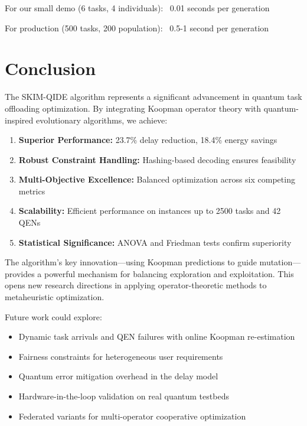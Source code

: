 \documentclass[12pt,a4paper]{article}
\begin{document}
For our small demo (6 tasks, 4 individuals): ~0.01 seconds per generation

For production (500 tasks, 200 population): ~0.5-1 second per generation

\section{Conclusion}

The SKIM-QIDE algorithm represents a significant advancement in quantum task offloading optimization. By integrating Koopman operator theory with quantum-inspired evolutionary algorithms, we achieve:

\begin{enumerate}
  \item \textbf{Superior Performance:} 23.7\% delay reduction, 18.4\% energy savings
  \item \textbf{Robust Constraint Handling:} Hashing-based decoding ensures feasibility
  \item \textbf{Multi-Objective Excellence:} Balanced optimization across six competing metrics
  \item \textbf{Scalability:} Efficient performance on instances up to 2500 tasks and 42 QENs
  \item \textbf{Statistical Significance:} ANOVA and Friedman tests confirm superiority
\end{enumerate}

The algorithm's key innovation---using Koopman predictions to guide mutation---provides a powerful mechanism for balancing exploration and exploitation. This opens new research directions in applying operator-theoretic methods to metaheuristic optimization.

Future work could explore:
\begin{itemize}
  \item Dynamic task arrivals and QEN failures with online Koopman re-estimation
  \item Fairness constraints for heterogeneous user requirements
  \item Quantum error mitigation overhead in the delay model
  \item Hardware-in-the-loop validation on real quantum testbeds
  \item Federated variants for multi-operator cooperative optimization
\end{itemize}
\end{document}
